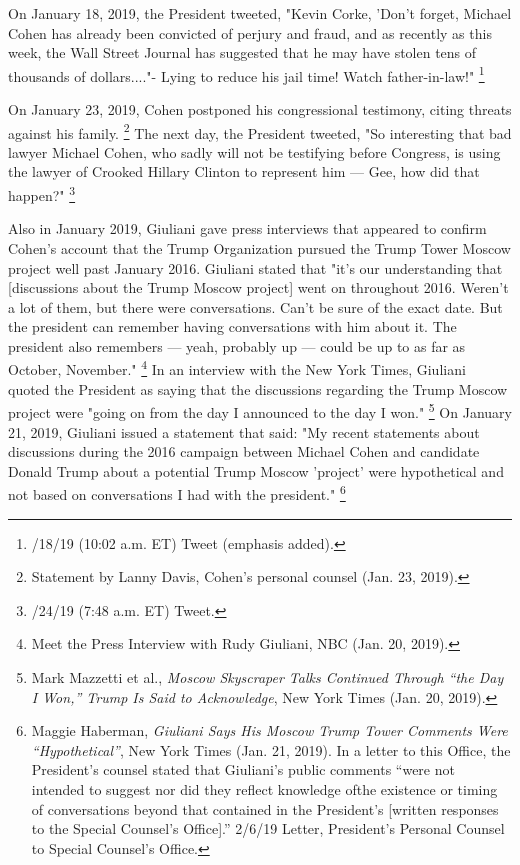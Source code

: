 {On January 18, 2019, the President tweeted, "Kevin Corke, \@FoxNews 'Don't forget, Michael Cohen has already been convicted of perjury and fraud, and as recently as this week, the Wall Street Journal has suggested that he may have stolen tens of thousands of dollars...."- Lying to reduce his jail time! Watch father-in-law!"%
\footnote{/18/19 (10:02 a.m. ET) Tweet (emphasis added).}

On January 23, 2019, Cohen postponed his congressional testimony, citing threats against his family.%
\footnote{Statement by Lanny Davis, Cohen’s personal counsel (Jan. 23, 2019).}
The next day, the President tweeted, "So interesting that bad lawyer Michael Cohen, who sadly will not be testifying before Congress, is using the lawyer of Crooked Hillary Clinton to represent him — Gee, how did that happen?"%
\footnote{/24/19 (7:48 a.m. ET) Tweet.}

Also in January 2019, Giuliani gave press interviews that appeared to confirm Cohen's account that the Trump Organization pursued the Trump Tower Moscow project well past January 2016.
Giuliani stated that "it's our understanding that [discussions about the Trump Moscow project] went on throughout 2016.
Weren't a lot of them, but there were conversations.
Can't be sure of the exact date.
But the president can remember having conversations with him about it.
The president also remembers — yeah, probably up — could be up to as far as October, November."%
\footnote{Meet the Press Interview with Rudy Giuliani, NBC (Jan. 20, 2019).}
In an interview with the New York Times, Giuliani quoted the President as saying that the discussions regarding the Trump Moscow project were "going on from the day I announced to the day I won."%
\footnote{Mark Mazzetti et al., \textit{Moscow Skyscraper Talks Continued Through “the Day I Won,” Trump Is Said to Acknowledge}, New York Times (Jan. 20, 2019).}
On January 21, 2019, Giuliani issued a statement that said: "My recent statements about discussions during the 2016 campaign between Michael Cohen and candidate Donald Trump about a potential Trump Moscow 'project' were hypothetical and not based on conversations I had with the president."%
\footnote{Maggie Haberman, \textit{Giuliani Says His Moscow Trump Tower Comments Were “Hypothetical”}, New York Times (Jan. 21, 2019).
In a letter to this Office, the President’s counsel stated that Giuliani’s public comments “were not intended to suggest nor did they reflect knowledge ofthe existence or timing of conversations beyond that contained in the President’s [written responses to the Special Counsel’s Office].”
2/6/19 Letter, President’s Personal Counsel to Special Counsel’s Office.}

}
